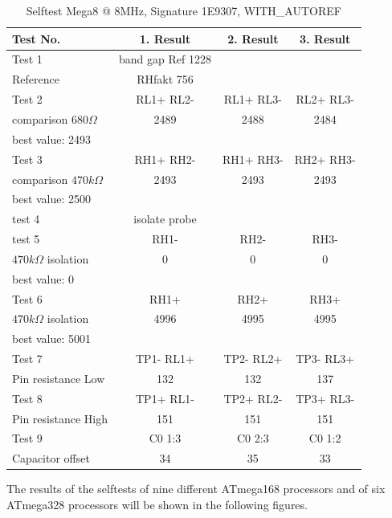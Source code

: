\begin{table}[H]
  \begin{center}
    \begin{tabular}{| l | c | c | c |}
    \hline
Test No. & 1. Result & 2. Result & 3. Result \\
    \hline
    \hline
Test 1 & band gap Ref  1228 &  & \\
Reference  & RHfakt 756 & &  \\
    \hline
Test 2 & RL1+ RL2- & RL1+ RL3- & RL2+ RL3- \\
comparison \(680\Omega\) & 2489 & 2488 & 2484 \\
best value: 2493 & & & \\
    \hline
Test 3 & RH1+ RH2- & RH1+ RH3- & RH2+ RH3- \\
comparison \(470k\Omega\) & 2493 & 2493 & 2493 \\
best value: 2500 & & & \\
    \hline
test 4 & isolate probe & & \\
    \hline
test 5 & RH1- &  RH2- & RH3- \\
\(470k\Omega\) isolation & 0 & 0 & 0 \\
best value: 0 & & & \\
    \hline
Test 6 & RH1+ & RH2+ & RH3+ \\
\(470k\Omega\) isolation & 4996 & 4995 & 4995 \\
best value: 5001 & & & \\
    \hline
Test 7 & TP1- RL1+ & TP2- RL2+ & TP3- RL3+ \\
Pin resistance Low & 132 & 132 & 137 \\
    \hline
Test 8 & TP1+ RL1- & TP2+ RL2- & TP3+ RL3- \\
Pin resistance High & 151 & 151 & 151 \\
    \hline
Test 9 & C0 1:3 & C0 2:3 & C0 1:2 \\
Capacitor offset & 34 & 35 & 33 \\
    \hline
    \end{tabular}
  \end{center}
  \caption{Selftest Mega8 @ 8MHz, Signature 1E9307, WITH\_AUTOREF}
  \label{tab:test_m8} 
\end{table}

The results of the selftests of nine different ATmega168 processors and of six ATmega328 processors
will be shown in the following figures.

